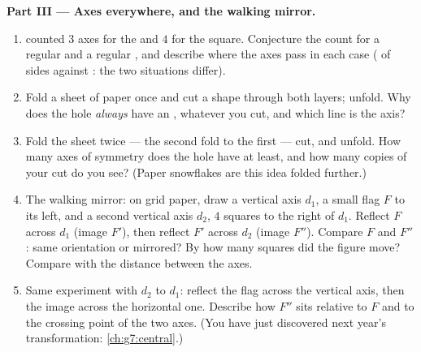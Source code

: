 \begin{problem}
\medskip
\noindent\textbf{Part III --- Axes everywhere, and the walking
mirror.}
\begin{enumerate}[resume]
  \item {} counted $3$ axes for the
         and $4$ for the square. Conjecture
        the count for a regular  and a regular ,
        and describe where the axes pass in each case ( of sides against : the two situations
        differ).
  \item Fold a sheet of paper once and cut a shape through both
        layers; unfold. Why does the hole \emph{always} have an
        , whatever you cut, and which line is
        the axis?
  \item Fold the sheet twice --- the second fold 
        to the first --- cut, and unfold. How many axes of
        symmetry does the hole have at least, and how many
        copies of your cut do you see? (Paper snowflakes are
        this idea folded further.)
  \item The walking mirror: on grid paper, draw a vertical axis
        $d_1$, a small flag $F$ to its left, and a second
        vertical axis $d_2$, $4$ squares to the right of $d_1$.
        Reflect $F$ across $d_1$ (image $F'$), then reflect
        $F'$ across $d_2$ (image $F''$). Compare $F$ and $F''$:
        same orientation or mirrored? By how many squares did
        the figure move? Compare with the distance between the
        axes.
  \item Same experiment with $d_2$ \emph{} to
        $d_1$: reflect the flag across the vertical axis, then
        the image across the horizontal one. Describe how $F''$
        sits relative to $F$ and to the crossing point of the
        two axes. (You have just discovered next year's
        transformation: \cref{ch:g7:central}.)
\end{enumerate}
\end{problem}
